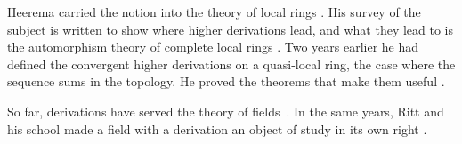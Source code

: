 Heerema carried the notion into the theory of local rings \cite[Introduction,
p.~31]{Heerema1968Convergent}. His survey of the subject is written to show
where higher derivations lead, and what they lead to is the automorphism
theory of complete local rings \cite[Introduction,
p.~1212]{Heerema1970Higher}. Two years earlier he had defined the convergent
higher derivations on a quasi-local ring, the case where the sequence sums in
the topology. He proved the theorems that make them useful
\cite[Introduction, p.~31]{Heerema1968Convergent}.

So far, derivations have served the theory of fields~\cite[p.~1]{Ritt1950}. In the same years, Ritt
and his school made a field with a derivation an object of study in its own
right \cite[p.~1]{Ritt1950}.
